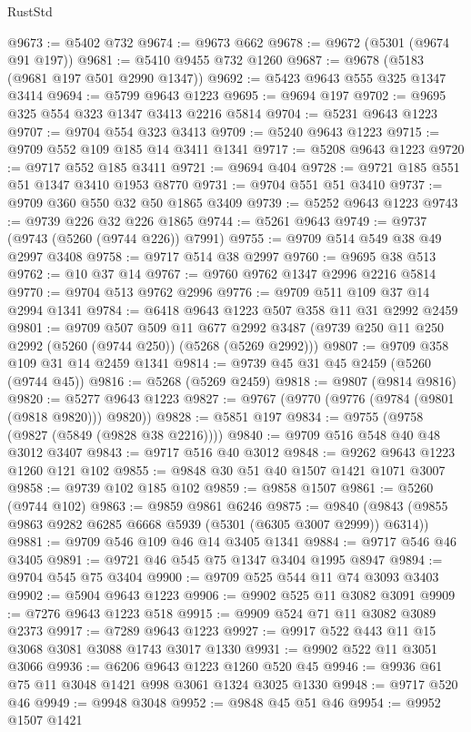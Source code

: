 \begin{lexlean}{RustStd}
\begin{coremodule}
@9673 := @5402 @732
@9674 := @9673 @662
@9678 := @9672 (@5301 (@9674 @91 @197))
@9681 := @5410 @9455 @732 @1260
@9687 := @9678 (@5183 (@9681 @197 @501 @2990 @1347))
@9692 := @5423 @9643 @555 @325 @1347 @3414
@9694 := @5799 @9643 @1223
@9695 := @9694 @197
@9702 := @9695 @325 @554 @323 @1347 @3413 @2216 @5814
@9704 := @5231 @9643 @1223
@9707 := @9704 @554 @323 @3413
@9709 := @5240 @9643 @1223
@9715 := @9709 @552 @109 @185 @14 @3411 @1341
@9717 := @5208 @9643 @1223
@9720 := @9717 @552 @185 @3411
@9721 := @9694 @404
@9728 := @9721 @185 @551 @51 @1347 @3410 @1953 @8770
@9731 := @9704 @551 @51 @3410
@9737 := @9709 @360 @550 @32 @50 @1865 @3409
@9739 := @5252 @9643 @1223
@9743 := @9739 @226 @32 @226 @1865
@9744 := @5261 @9643
@9749 := @9737 (@9743 (@5260 (@9744 @226)) @7991)
@9755 := @9709 @514 @549 @38 @49 @2997 @3408
@9758 := @9717 @514 @38 @2997
@9760 := @9695 @38 @513
@9762 := @10 @37 @14
@9767 := @9760 @9762 @1347 @2996 @2216 @5814
@9770 := @9704 @513 @9762 @2996
@9776 := @9709 @511 @109 @37 @14 @2994 @1341
@9784 := @6418 @9643 @1223 @507 @358 @11 @31 @2992 @2459
@9801 := @9709
    @507
    @509
    @11
    @677
    @2992
    @3487
    (@9739 @250 @11 @250 @2992 (@5260 (@9744 @250)) (@5268 (@5269 @2992)))
@9807 := @9709 @358 @109 @31 @14 @2459 @1341
@9814 := @9739 @45 @31 @45 @2459 (@5260 (@9744 @45))
@9816 := @5268 (@5269 @2459)
@9818 := @9807 (@9814 @9816)
@9820 := @5277 @9643 @1223
@9827 := @9767 (@9770 (@9776 (@9784 (@9801 (@9818 @9820))) @9820))
@9828 := @5851 @197
@9834 := @9755 (@9758 (@9827 (@5849 (@9828 @38 @2216))))
@9840 := @9709 @516 @548 @40 @48 @3012 @3407
@9843 := @9717 @516 @40 @3012
@9848 := @9262 @9643 @1223 @1260 @121 @102
@9855 := @9848 @30 @51 @40 @1507 @1421 @1071 @3007
@9858 := @9739 @102 @185 @102
@9859 := @9858 @1507
@9861 := @5260 (@9744 @102)
@9863 := @9859 @9861 @6246
@9875 := @9840 (@9843 (@9855 @9863 @9282 @6285 @6668 @5939 (@5301 (@6305 @3007 @2999)) @6314))
@9881 := @9709 @546 @109 @46 @14 @3405 @1341
@9884 := @9717 @546 @46 @3405
@9891 := @9721 @46 @545 @75 @1347 @3404 @1995 @8947
@9894 := @9704 @545 @75 @3404
@9900 := @9709 @525 @544 @11 @74 @3093 @3403
@9902 := @5904 @9643 @1223
@9906 := @9902 @525 @11 @3082 @3091
@9909 := @7276 @9643 @1223 @518
@9915 := @9909 @524 @71 @11 @3082 @3089 @2373
@9917 := @7289 @9643 @1223
@9927 := @9917 @522 @443 @11 @15 @3068 @3081 @3088 @1743 @3017 @1330
@9931 := @9902 @522 @11 @3051 @3066
@9936 := @6206 @9643 @1223 @1260 @520 @45
@9946 := @9936 @61 @75 @11 @3048 @1421 @998 @3061 @1324 @3025 @1330
@9948 := @9717 @520 @46
@9949 := @9948 @3048
@9952 := @9848 @45 @51 @46
@9954 := @9952 @1507 @1421

\end{coremodule}
\end{lexlean}
